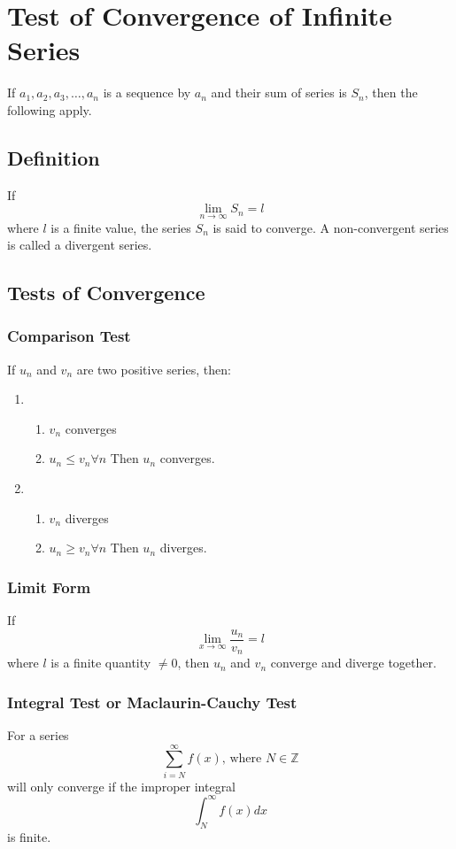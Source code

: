 \chapter{Test of Convergence of Infinite Series}
If $a_1, a_2, a_3,\ldots, a_n$ is a sequence by $a_n$ and their sum of series is $S_n$, then the following apply.


\section{Definition}
If
\begin{equation*}
	\lim_{n\to\infty} S_n = l
\end{equation*}
where $l$ is a finite value, the series $S_n$ is said to converge.
A non-convergent series is called a divergent series.


\section{Tests of Convergence}
\subsection{Comparison Test}
If $u_n$ and $v_n$ are two positive series, then:
\begin{enumerate}
	\item \begin{enumerate}
		\item $v_n$ converges
		\item $u_n\leq v_n \forall n$
		Then $u_n$ converges.
	\end{enumerate}
	\item \begin{enumerate}
		\item $v_n$ diverges
		\item $u_n\geq v_n \forall n$
		Then $u_n$ diverges.
	\end{enumerate}
\end{enumerate}

\subsection{Limit Form}
If
\begin{equation}
	\lim_{x\to\infty} \dfrac{u_n}{v_n} = l \nonumber
\end{equation}
where $l$ is a finite quantity $\neq0$, then $u_n$ and $v_n$ converge and diverge together.

\subsection{Integral Test or Maclaurin-Cauchy Test}
For a series
\begin{equation}
	\sum_{i=N}^{\infty} f(x)\text{, where } N\in\mathbb{Z}
\end{equation}
will only converge if the improper integral
\begin{equation}
	\int_{N}^{\infty} f(x) dx
\end{equation}
is finite.

